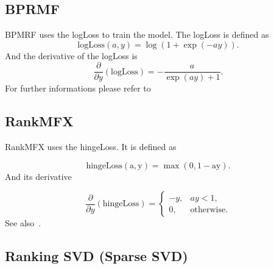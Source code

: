 \subsection{BPRMF}

BPMRF uses the logLoss to train the model. The logLoss is defined
as
\begin{equation}
\textrm{logLoss}(a,y)=\log(1+\exp(-ay)).
\end{equation}
And the derivative of the logLoss is
\begin{equation}
\frac{\partial}{\partial y}(\textrm{logLoss})=-\frac{a}{\exp(ay)+1}.
\end{equation}
For further informations please refer to~\cite{Rendle:2009:BBP:1795114.1795167}


\subsection{RankMFX}

RankMFX uses the hingeLoss. It is defined as

\begin{equation}
\mathrm{\textrm{hingeLoss}(a,y)=\max(0,1-ay)}.
\end{equation}
And its derivative

\begin{equation}
\frac{\partial}{\partial y}(\textrm{hingeLoss})=\begin{cases}
-y, & ay<1,\\
0, & \textrm{otherwise}.
\end{cases}
\end{equation}
See also~\cite{diaz2012happening}.


\subsection{Ranking SVD (Sparse SVD)}

